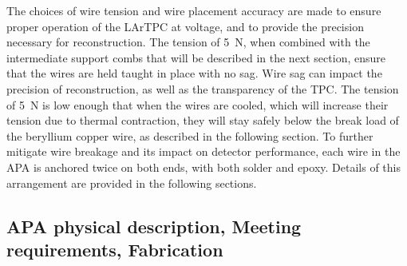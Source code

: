 The choices of wire tension and wire placement accuracy are made to ensure proper operation of the LArTPC at voltage, and to provide the precision necessary for reconstruction.  The tension of 5~N, when combined with the intermediate support combs that will be described in the next section,  ensure that the wires are held taught in place with no sag.  Wire sag can impact the precision of reconstruction, as well as the transparency of the TPC.  The tension of 5~N is low enough that when the wires are cooled, which will increase their tension due to thermal contraction, they will stay safely below the break load of the beryllium copper wire, as described in the following section.   To further mitigate wire breakage and its impact on detector performance, each wire in the APA is anchored twice on both ends, with both solder and epoxy.  Details of this arrangement are provided in the following sections.  







\subsection{APA physical description, Meeting requirements, Fabrication}

